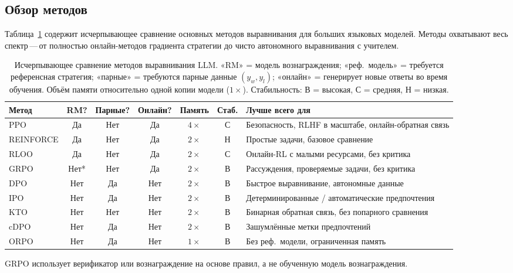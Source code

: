\subsection{Обзор методов}

Таблица~\ref{tab:alignment-comparison} содержит исчерпывающее сравнение основных методов выравнивания для больших языковых моделей. Методы охватывают весь спектр\,---\,от полностью онлайн-методов градиента стратегии до чисто автономного выравнивания с учителем.

\begin{table}[ht]
\centering
\caption{Исчерпывающее сравнение методов выравнивания LLM. «RM» = модель вознаграждения; «реф.\ модель» = требуется референсная стратегия; «парные» = требуются парные данные $(y_w, y_l)$; «онлайн» = генерирует новые ответы во время обучения. Объём памяти относительно одной копии модели ($1\times$). Стабильность: В = высокая, С = средняя, Н = низкая.}
\label{tab:alignment-comparison}
\footnotesize
\begin{tabular}{@{}lcccccp{3.2cm}@{}}
\toprule
\textbf{Метод} & \textbf{RM?} & \textbf{Парные?} & \textbf{Онлайн?} & \textbf{Память} & \textbf{Стаб.} & \textbf{Лучше всего для} \\
\midrule
PPO        & Да  & Нет & Да  & $4\times$ & С & Безопасность, RLHF в масштабе, онлайн-обратная связь \\
REINFORCE  & Да  & Нет & Да  & $2\times$ & Н & Простые задачи, базовое сравнение \\
RLOO       & Да  & Нет & Да  & $2\times$ & С & Онлайн-RL с малыми ресурсами, без критика \\
GRPO       & Нет* & Нет & Да & $2\times$ & В & Рассуждения, проверяемые задачи, без критика \\
DPO        & Нет & Да  & Нет & $2\times$ & В & Быстрое выравнивание, автономные данные \\
IPO        & Нет & Да  & Нет & $2\times$ & В & Детерминированные / автоматические предпочтения \\
KTO        & Нет & Нет & Нет & $2\times$ & В & Бинарная обратная связь, без попарного сравнения \\
cDPO       & Нет & Да  & Нет & $2\times$ & В & Зашумлённые метки предпочтений \\
ORPO       & Нет & Да  & Нет & $1\times$ & В & Без реф.\ модели, ограниченная память \\
\bottomrule
\end{tabular}

\smallskip
{\footnotesize *GRPO использует верификатор или вознаграждение на основе правил, а не обученную модель вознаграждения.}
\end{table}

